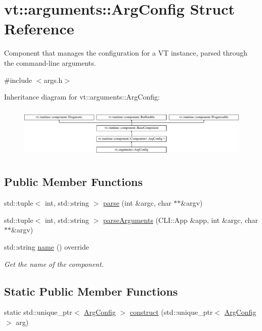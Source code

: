 \hypertarget{structvt_1_1arguments_1_1_arg_config}{}\section{vt\+:\+:arguments\+:\+:Arg\+Config Struct Reference}
\label{structvt_1_1arguments_1_1_arg_config}


Component that manages the configuration for a VT instance, parsed through the command-\/line arguments.  




{\ttfamily \#include $<$args.\+h$>$}

Inheritance diagram for vt\+:\+:arguments\+:\+:Arg\+Config\+:\begin{figure}[H]
\begin{center}
\leavevmode
\includegraphics[height=2.531073cm]{structvt_1_1arguments_1_1_arg_config}
\end{center}
\end{figure}
\subsection*{Public Member Functions}
\begin{DoxyCompactItemize}
\item 
std\+::tuple$<$ int, std\+::string $>$ \hyperlink{structvt_1_1arguments_1_1_arg_config_a124125d908a910cf52c6c59a3f0f2713}{parse} (int \&argc, char $\ast$$\ast$\&argv)
\item 
std\+::tuple$<$ int, std\+::string $>$ \hyperlink{structvt_1_1arguments_1_1_arg_config_ac6711ab96113f032b9e0a0b12d24eda3}{parse\+Arguments} (C\+L\+I\+::\+App \&app, int \&argc, char $\ast$$\ast$\&argv)
\item 
std\+::string \hyperlink{structvt_1_1arguments_1_1_arg_config_ade5e5994235f0953970fc3f460f9167a}{name} () override
\begin{DoxyCompactList}\small\item\em Get the name of the component. \end{DoxyCompactList}\end{DoxyCompactItemize}
\subsection*{Static Public Member Functions}
\begin{DoxyCompactItemize}
\item 
static std\+::unique\+\_\+ptr$<$ \hyperlink{structvt_1_1arguments_1_1_arg_config}{Arg\+Config} $>$ \hyperlink{structvt_1_1arguments_1_1_arg_config_a2248f3913b93ca336fdac5c2ec9c6e0b}{construct} (std\+::unique\+\_\+ptr$<$ \hyperlink{structvt_1_1arguments_1_1_arg_config}{Arg\+Config} $>$ arg)
\end{DoxyCompactItemize}
